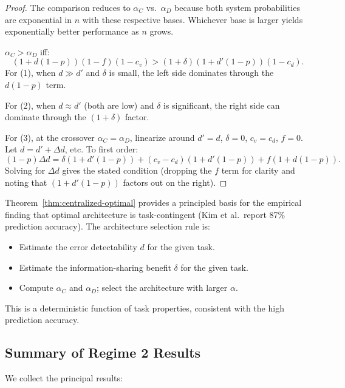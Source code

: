\begin{proof}
The comparison reduces to $\alpha_C$ vs.\ $\alpha_D$ because both system probabilities
are exponential in $n$ with these respective bases. Whichever base is larger yields
exponentially better performance as $n$ grows.

$\alpha_C > \alpha_D$ iff:
\[
  (1+d(1-p))(1-f)(1-c_v) > (1+\delta)(1+d'(1-p))(1-c_d).
\]
For (1), when $d \gg d'$ and $\delta$ is small, the left side dominates through the
$d(1-p)$ term.

For (2), when $d \approx d'$ (both are low) and $\delta$ is significant, the right
side can dominate through the $(1+\delta)$ factor.

For (3), at the crossover $\alpha_C = \alpha_D$, linearize around $d' = d$, $\delta = 0$,
$c_v = c_d$, $f = 0$. Let $d = d' + \Delta d$, etc. To first order:
\[
  (1-p)\Delta d = \delta(1+d'(1-p)) + (c_v - c_d)(1+d'(1-p)) + f(1+d(1-p)).
\]
Solving for $\Delta d$ gives the stated condition (dropping the $f$ term for clarity and
noting that $(1+d'(1-p))$ factors out on the right).
\end{proof}

\begin{remark}
Theorem~\ref{thm:centralized-optimal} provides a principled basis for the empirical finding
that optimal architecture is task-contingent (Kim et al.\ report 87\% prediction accuracy).
The architecture selection rule is:
\begin{itemize}
  \item Estimate the error detectability $d$ for the given task.
  \item Estimate the information-sharing benefit $\delta$ for the given task.
  \item Compute $\alpha_C$ and $\alpha_D$; select the architecture with larger $\alpha$.
\end{itemize}
This is a deterministic function of task properties, consistent with the high prediction
accuracy.
\end{remark}

\subsection{Summary of Regime 2 Results}

We collect the principal results:

